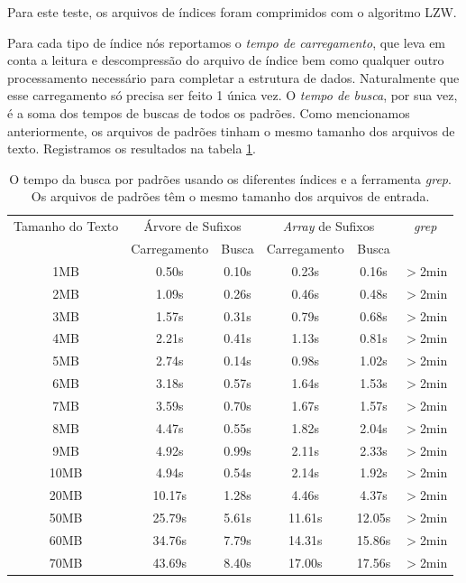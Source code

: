 \documentclass[]{article}
\begin{document}
Para este teste, os arquivos de índices foram comprimidos com o algoritmo LZW. 

Para cada tipo de índice nós reportamos o \textit{tempo de carregamento}, que leva em conta a leitura e descompressão do arquivo de índice bem como qualquer outro processamento necessário para completar a estrutura de dados. Naturalmente que esse carregamento só precisa ser feito 1 única vez. O \textit{tempo de busca}, por sua vez, é a soma dos tempos de buscas de todos os padrões. Como mencionamos anteriormente, os arquivos de padrões tinham o mesmo tamanho dos arquivos de texto. Registramos os resultados na tabela \ref{tab:t2}.

\begin{table}
	\begin{tabular}{c|c|c|c|c|c}
		Tamanho do Texto & \multicolumn{2}{c|}{Árvore de Sufixos} & \multicolumn{2}{c|}{\textit{Array} de Sufixos} & \textit{grep} \\
						 & 		Carregamento & Busca			  &			 Carregamento & Busca				   & \\
		\hline
            1MB &  0.50s  &  0.10s &  0.23s &  0.16s & $>$2min \\
            2MB &  1.09s  &  0.26s &  0.46s &  0.48s & $>$2min \\
            3MB &  1.57s  &  0.31s &  0.79s &  0.68s & $>$2min \\
            4MB &  2.21s  &  0.41s &  1.13s &  0.81s & $>$2min \\
            5MB &  2.74s  &  0.14s &  0.98s &  1.02s & $>$2min \\
            6MB &  3.18s  &  0.57s &  1.64s &  1.53s & $>$2min \\
            7MB &  3.59s  &  0.70s &  1.67s &  1.57s & $>$2min \\
            8MB &  4.47s  &  0.55s &  1.82s &  2.04s & $>$2min \\
            9MB &  4.92s  &  0.99s &  2.11s &  2.33s & $>$2min \\
           10MB &  4.94s  &  0.54s &  2.14s &  1.92s & $>$2min \\
           20MB & 10.17s  &  1.28s &  4.46s &  4.37s & $>$2min \\
           50MB & 25.79s  &  5.61s & 11.61s & 12.05s & $>$2min \\
           60MB & 34.76s  &  7.79s & 14.31s & 15.86s & $>$2min \\
           70MB & 43.69s  &  8.40s & 17.00s & 17.56s & $>$2min \\
	\end{tabular}
\caption{O tempo da busca por padrões usando os diferentes índices e a ferramenta \textit{grep}. Os arquivos de padrões têm o mesmo tamanho dos arquivos de entrada.}
\label{tab:t2}
\end{table}
\end{document}
